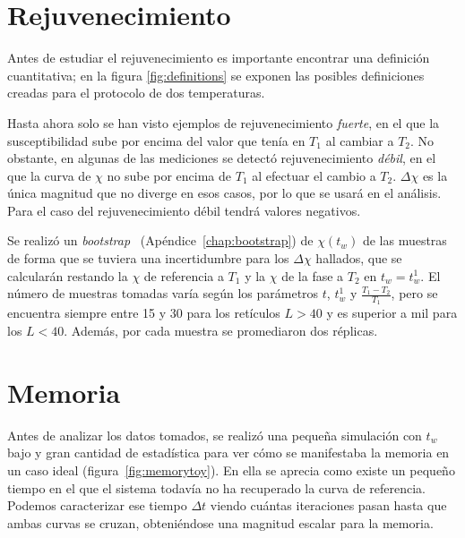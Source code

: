\documentclass[11pt]{report}
\begin{document}
\section{Rejuvenecimiento}
Antes de estudiar el rejuvenecimiento es importante encontrar una
definición cuantitativa; en la figura \ref{fig:definitions} se
exponen las posibles definiciones creadas para el protocolo
de dos temperaturas.

Hasta ahora solo se han visto ejemplos de rejuvenecimiento
\emph{fuerte}, en el que la susceptibilidad sube por encima del valor
que tenía en $T_1$ al cambiar a $T_2$. No obstante, en algunas de las
mediciones se detectó rejuvenecimiento \emph{débil}, en el que la
curva de $χ$ no sube por encima de $T_1$ al efectuar el cambio a
$T_2$. $Δχ$ es la única magnitud que no diverge en esos casos, por lo
que se usará en el análisis. Para el caso del rejuvenecimiento débil
tendrá valores negativos.

Se realizó un \textit{bootstrap}~\cite{boot}
(Apéndice~\ref{chap:bootstrap}) de $χ(t_w)$ de las muestras de forma
que se tuviera una incertidumbre para los $Δχ$ hallados, que se
calcularán restando la $χ$ de referencia a $T_1$ y la $χ$ de la fase a
$T_2$ en $t_w = t_w^1$. El número de muestras tomadas varía según los
parámetros $t$,  $t_w^1$ y $\frac{T_1-T_2}{T_1}$, pero se encuentra siempre
entre 15 y 30 para los retículos $L>40$ y es superior a mil para los
$L<40$. Además, por cada muestra se promediaron dos réplicas.


\section{Memoria}

Antes de analizar los datos tomados, se realizó una pequeña simulación
con $t_w$ bajo y gran cantidad de estadística para ver cómo se
manifestaba la memoria en un caso ideal (figura~\ref{fig:memorytoy}).
En ella se aprecia como existe un pequeño tiempo en el que el sistema
todavía no ha recuperado la curva de referencia. Podemos caracterizar
ese tiempo $Δt$ viendo cuántas iteraciones pasan hasta que ambas
curvas se cruzan, obteniéndose una magnitud escalar para la memoria.
\end{document}
